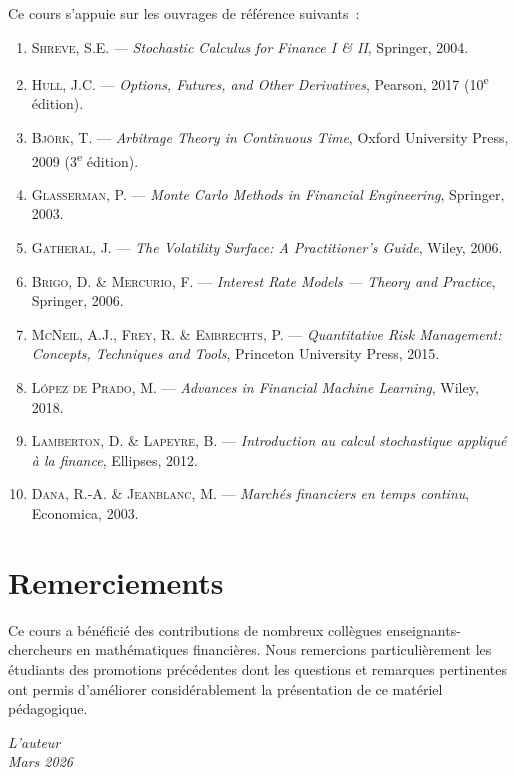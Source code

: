 Ce cours s'appuie sur les ouvrages de r\'ef\'erence suivants~:

\begin{enumerate}
    \item \textsc{Shreve}, S.E. --- \textit{Stochastic Calculus for Finance
          I \& II}, Springer, 2004.
    \item \textsc{Hull}, J.C. --- \textit{Options, Futures, and Other Derivatives},
          Pearson, 2017 (10\textsuperscript{e} \'edition).
    \item \textsc{Bj\"ork}, T. --- \textit{Arbitrage Theory in Continuous Time},
          Oxford University Press, 2009 (3\textsuperscript{e} \'edition).
    \item \textsc{Glasserman}, P. --- \textit{Monte Carlo Methods in Financial
          Engineering}, Springer, 2003.
    \item \textsc{Gatheral}, J. --- \textit{The Volatility Surface: A Practitioner's
          Guide}, Wiley, 2006.
    \item \textsc{Brigo}, D. \& \textsc{Mercurio}, F. --- \textit{Interest Rate
          Models --- Theory and Practice}, Springer, 2006.
    \item \textsc{McNeil}, A.J., \textsc{Frey}, R. \& \textsc{Embrechts}, P.
          --- \textit{Quantitative Risk Management: Concepts, Techniques and Tools},
          Princeton University Press, 2015.
    \item \textsc{L\'opez de Prado}, M. --- \textit{Advances in Financial Machine
          Learning}, Wiley, 2018.
    \item \textsc{Lamberton}, D. \& \textsc{Lapeyre}, B. --- \textit{Introduction
          au calcul stochastique appliqu\'e \`a la finance}, Ellipses, 2012.
    \item \textsc{Dana}, R.-A. \& \textsc{Jeanblanc}, M. --- \textit{March\'es
          financiers en temps continu}, Economica, 2003.
\end{enumerate}

\section*{Remerciements}

Ce cours a b\'en\'efici\'e des contributions de nombreux coll\`egues
enseignants-chercheurs en math\'ematiques financi\`eres. Nous remercions
particuli\`erement les \'etudiants des promotions pr\'ec\'edentes dont
les questions et remarques pertinentes ont permis d'am\'eliorer
consid\'erablement la pr\'esentation de ce mat\'eriel p\'edagogique.

\bigskip
\begin{flushright}
    \textit{L'auteur}\\
    \textit{Mars 2026}
\end{flushright}

\newpage
